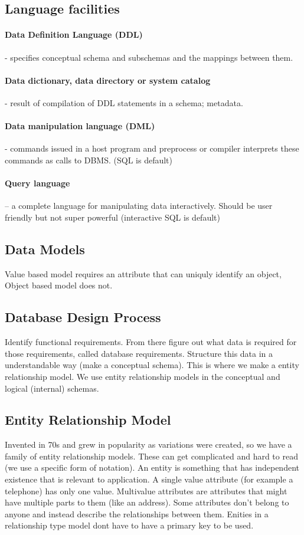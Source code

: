 \documentclass{article}
\begin{document}
\subsection*{Language facilities}
\paragraph{Data Definition Language (DDL)} - specifies conceptual schema and subschemas and the mappings between them.
\paragraph{Data dictionary, data directory or system catalog} - result of compilation of DDL statements in a schema; metadata.
\paragraph{Data manipulation language (DML)} - commands issued in a host program and preprocess or compiler interprets these commands as calls to DBMS. (SQL is default)
\paragraph{Query language} – a complete language for manipulating data interactively. Should be user friendly but not super powerful (interactive SQL is default)

\subsection*{Data Models}
Value based model requires an attribute that can uniquly identify an object, Object based model does not.

\subsection*{Database Design Process}
Identify functional requirements. From there figure out what data is required for those requirements, called database requirements. Structure this data in a understandable way (make a conceptual schema). This is where we make a entity relationship model. We use entity relationship models in the conceptual and logical (internal) schemas.

\subsection*{Entity Relationship Model}
Invented in 70s and grew in popularity as variations were created, so we have a family of entity relationship models. These can get complicated and hard to read (we use a specific form of notation). An entity is something that has independent existence that is relevant to application. A single value attribute (for example a telephone) has only one value. Multivalue attributes are attributes that might have multiple parts to them (like an address). Some attributes don't belong to anyone and instead describe the relationships between them. Enities in a relationship type model dont have to have a primary key to be used.
\end{document}
